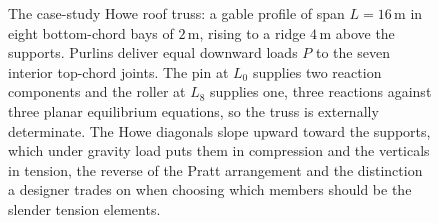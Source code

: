 \begin{figure}[htbp]
\caption[Case-study Howe roof truss]{The case-study Howe roof truss: a
gable profile of span $L=16\,\si{\meter}$ in eight bottom-chord bays of
$2\,\si{\meter}$, rising to a ridge $4\,\si{\meter}$ above the supports.
Purlins deliver equal downward loads $P$ to the seven interior top-chord
joints. The pin at $L_0$ supplies two reaction components and the roller
at $L_8$ supplies one, three reactions against three planar equilibrium
equations, so the truss is externally determinate. The Howe diagonals
slope upward toward the supports, which under gravity load puts them in
compression and the verticals in tension, the reverse of the Pratt
arrangement and the distinction a designer trades on when choosing which
members should be the slender tension elements.}
\label{fig:vol03ch02:howe-roof-truss}
\end{figure}
